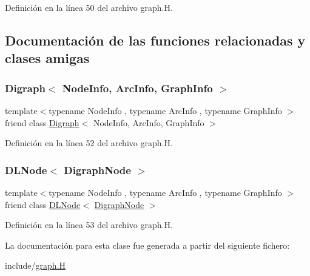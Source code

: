 Definición en la línea 50 del archivo graph.\+H.



\subsection{Documentación de las funciones relacionadas y clases amigas}
\mbox{\label{class_designar_1_1_digraph_node_abc8f370e4ec7084a6574cf967a5a5aaf}} 
\subsubsection{\texorpdfstring{Digraph$<$ Node\+Info, Arc\+Info, Graph\+Info $>$}{Digraph< NodeInfo, ArcInfo, GraphInfo >}}
{\footnotesize\ttfamily template$<$typename Node\+Info , typename Arc\+Info , typename Graph\+Info $>$ \\
friend class \hyperlink{class_designar_1_1_digraph}{Digraph}$<$ Node\+Info, Arc\+Info, Graph\+Info $>$\hspace{0.3cm}{\ttfamily [friend]}}



Definición en la línea 52 del archivo graph.\+H.

\mbox{\label{class_designar_1_1_digraph_node_a5532eb461a543edfe19acf97b74316fc}} 
\subsubsection{\texorpdfstring{D\+L\+Node$<$ Digraph\+Node $>$}{DLNode< DigraphNode >}}
{\footnotesize\ttfamily template$<$typename Node\+Info , typename Arc\+Info , typename Graph\+Info $>$ \\
friend class \hyperlink{class_designar_1_1_d_l_node}{D\+L\+Node}$<$ \hyperlink{class_designar_1_1_digraph_node}{Digraph\+Node} $>$\hspace{0.3cm}{\ttfamily [friend]}}



Definición en la línea 53 del archivo graph.\+H.



La documentación para esta clase fue generada a partir del siguiente fichero\+:\begin{DoxyCompactItemize}
\item 
include/\hyperlink{graph_8_h}{graph.\+H}\end{DoxyCompactItemize}
